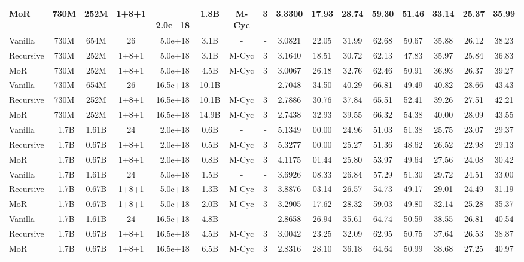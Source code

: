 \begin{table}[h!]
{\begin{tabular}{lc|cccc|cc|c|cccccc|c}
    \rowcolor[gray]{0.9}
    MoR & 730M & 252M & 1+8+1 & \,\,\,2.0e+18   & 1.8B & M-Cyc  & 3 & 3.3300 & 17.93 & 28.74 & 59.30 & 51.46 & 33.14 & 25.37 & 35.99  \\
    \midrule
    Vanilla & 730M & 654M & 26 &  \,\,\,5.0e+18   & 3.1B & -  & - & 3.0821 & 22.05 & 31.99 & 62.68 & 50.67 & 35.88 & 26.12 & 38.23  \\
    Recursive & 730M & 252M & 1+8+1 &  \,\,\,5.0e+18   & 3.1B & M-Cyc  & 3 & 3.1640 & 18.51 & 30.72 & 62.13 & 47.83 & 35.97 & 25.84 & 36.83  \\
    \rowcolor[gray]{0.9}
    MoR & 730M & 252M & 1+8+1 &  \,\,\,5.0e+18   & 4.5B & M-Cyc  & 3 & 3.0067 & 26.18 & 32.76 & 62.46 & 50.91 & 36.93 & 26.37 & 39.27  \\
    \midrule
    Vanilla & 730M & 654M & 26 & 16.5e+18  & \!\!\!10.1B & -  & - & 2.7048 & 34.50 & 40.29 & 66.81 & 49.49 & 40.82 & 28.66 & 43.43  \\
    Recursive & 730M & 252M & 1+8+1 & 16.5e+18  & \!\!\!10.1B & M-Cyc  & 3 & 2.7886 & 30.76 & 37.84 & 65.51 & 52.41 & 39.26 & 27.51 & 42.21  \\
    \rowcolor[gray]{0.9}
    MoR & 730M & 252M & 1+8+1 & 16.5e+18  & \!\!\!14.9B & M-Cyc  & 3 & 2.7438 & 32.93 & 39.55 & 66.32 & 54.38 & 40.00 & 28.09 & 43.55  \\
    \midrule
    \midrule
    Vanilla & \,\,\,1.7B & 1.61B & 24 & \,\,\,2.0e+18   & 0.6B & -  & - & 5.1349 & 00.00 & 24.96 & 51.03 & 51.38 & 25.75 & 23.07 & 29.37  \\
    Recursive & \,\,\,1.7B & 0.67B & 1+8+1 & \,\,\,2.0e+18   & 0.5B & M-Cyc  & 3 & 5.3277 & 00.00 & 25.27 & 51.36 & 48.62 & 26.52 & 22.98 & 29.13  \\
    \rowcolor[gray]{0.9}
    MoR & \,\,\,1.7B & 0.67B & 1+8+1 & \,\,\,2.0e+18   & 0.8B & M-Cyc  & 3 & 4.1175 & 01.44 & 25.80 & 53.97 & 49.64 & 27.56 & 24.08 & 30.42  \\
    \midrule
    Vanilla & \,\,\,1.7B & 1.61B & 24 &  \,\,\,5.0e+18   & 1.5B & -  & - & 3.6926 & 08.33 & 26.84 & 57.29 & 51.30 & 29.72 & 24.51 & 33.00  \\
    Recursive & \,\,\,1.7B & 0.67B & 1+8+1 &  \,\,\,5.0e+18   & 1.3B & M-Cyc  & 3 & 3.8876 & 03.14 & 26.57 & 54.73 & 49.17 & 29.01 & 24.49 & 31.19  \\
    \rowcolor[gray]{0.9}
    MoR & \,\,\,1.7B & 0.67B & 1+8+1 &  \,\,\,5.0e+18   & 2.0B & M-Cyc  & 3 & 3.2905 & 17.62 & 28.32 & 59.03 & 49.80 & 32.14 & 25.28 & 35.37  \\
    \midrule
    Vanilla & \,\,\,1.7B & 1.61B & 24 & 16.5e+18  & 4.8B & -  & - & 2.8658 & 26.94 & 35.61 & 64.74 & 50.59 & 38.55 & 26.81 & 40.54  \\
    Recursive & \,\,\,1.7B & 0.67B & 1+8+1 & 16.5e+18  & 4.5B & M-Cyc  & 3 & 3.0042 & 23.25 & 32.09 & 62.95 & 50.75 & 37.64 & 26.53 & 38.87  \\
    \rowcolor[gray]{0.9}
    MoR & \,\,\,1.7B & 0.67B & 1+8+1 & 16.5e+18  & 6.5B & M-Cyc  & 3 & 2.8316 & 28.10 & 36.18 & 64.64 & 50.99 & 38.68 & 27.25 & 40.97  \\
    \bottomrule
    \end{tabular}
    }
\end{table}